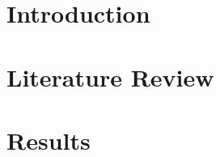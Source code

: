\documentclass[fleqn]{cas-sc}
\begin{document}
\section{Introduction}\label{What does the label do?}

\begin{comment}
	Notes from 5/16/22 meeting with Dr. Jin:
		I Motivation - Good, needs more material
		II Analyze Difficulty in Solving Problem
		III ML/Data Analysis
			Tradeoffs
			Limits of Methods
		IV Plan
		
		Mention overlaps with other work
\end{comment}

%
%
%
%
%

\section{Literature Review}








%
%

%		
%
%
%
%
%






%


%





\section{Results}


\end{document}
